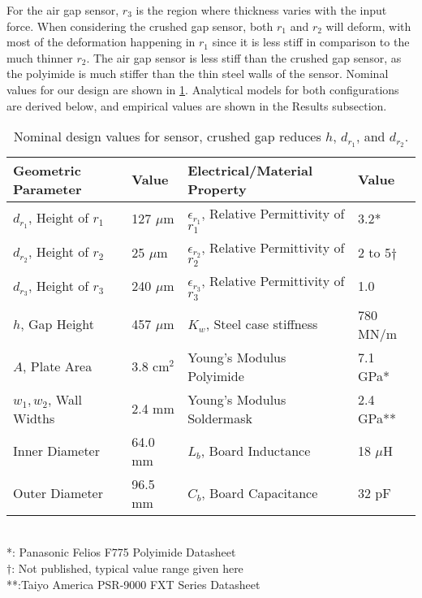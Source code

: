 For the air gap sensor, $r_3$ is the region where thickness varies with the input force.
When considering the crushed gap sensor, both $r_1$ and $r_2$ will deform, with most of the
deformation happening in $r_1$ since it is less stiff in comparison to the much thinner $r_2$. 
The air gap sensor is less stiff than the crushed gap sensor, as the polyimide is 
much stiffer than the thin steel walls of the sensor.
Nominal values for our design are shown in \ref{tab:values}.
Analytical models for both configurations are derived below,
 and empirical values are shown in the Results subsection.

\begin{table}[h]
{\centering
\caption{Nominal design values for sensor, crushed gap reduces $h$, $d_{r_1}$, and $d_{r_2}$.}
\label{tab:values}
\begin{tabular}{|l|l||l|l|}
\hline
Geometric Parameter & Value & Electrical/Material Property & Value \\ \hline
$d_{r_1}$, Height of $r_1$    & 127 $\mu$m & $\epsilon_{r_1}$, Relative Permittivity of $r_1$ & 3.2*  \\ \hline
$d_{r_2}$, Height of $r_2$    & 25  $\mu$m  & $\epsilon_{r_2}$, Relative Permittivity of $r_2$ & 2 to 5$\dagger$  \\ \hline
$d_{r_3}$, Height of $r_3$    & 240 $\mu$m & $\epsilon_{r_3}$, Relative Permittivity of $r_3$ & 1.0  \\ \hline
$h$, Gap Height    & 457 $\mu$m   &   $K_w$, Steel case stiffness & 780 MN/m       \\ \hline
$A$, Plate Area    & 3.8 cm$^2$   &  Young's Modulus Polyimide          & 7.1 GPa*         \\ \hline
$w_1, w_2$, Wall Widths   & 2.4 mm   &   Young's Modulus Soldermask  & 2.4 GPa** \\ \hline
Inner Diameter   & 64.0 mm   &     $L_b$, Board Inductance      & 18 $\mu$H    \\ \hline
Outer Diameter   & 96.5 mm &      $C_b$, Board Capacitance    & 32 pF             \\ \hline 
\end{tabular}
} \\ 
\footnotesize{*: Panasonic Felios F775 Polyimide Datasheet} \\
\footnotesize{$\dagger$: Not published, typical value range given here}\\
\footnotesize{**:Taiyo America PSR-9000 FXT Series Datasheet}\\
\end{table}

